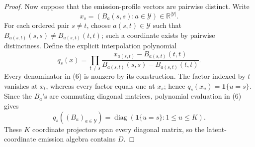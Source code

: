 \documentclass{article}
\begin{document}
\begin{proof}
Now suppose that the emission-profile vectors are pairwise distinct.  Write
\[
 x_s=(B_a(s,s):a\in\mathcal Y)\in\mathbb R^{|\mathcal Y|}.
\]
For each ordered pair \(s\neq t\), choose \(a(s,t)\in\mathcal Y\) such that \(B_{a(s,t)}(s,s)\neq B_{a(s,t)}(t,t)\); such a coordinate exists by pairwise distinctness.  Define the explicit interpolation polynomial
\[
 q_s(x)=\prod_{t\neq s}
 \frac{x_{a(s,t)}-B_{a(s,t)}(t,t)}
 {B_{a(s,t)}(s,s)-B_{a(s,t)}(t,t)}.                                             \tag{6}
\]
Every denominator in (6) is nonzero by its construction.  The factor indexed by \(t\) vanishes at \(x_t\), whereas every factor equals one at \(x_s\); hence \(q_s(x_u)=\mathbf 1\{u=s\}\).  Since the \(B_a\)'s are commuting diagonal matrices, polynomial evaluation in (6) gives
\[
 q_s((B_a)_{a\in\mathcal Y})=\operatorname{diag}(\mathbf 1\{u=s\}:1\leq u\leq K).
\]
These \(K\) coordinate projectors span every diagonal matrix, so the latent-coordinate emission algebra contains \(D\).


\end{proof}
\end{document}
